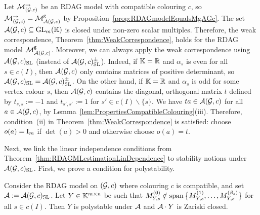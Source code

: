 \begin{remark}
	\label{rem:RDAGweakCorrespondence} %
	Let $\mathcal{M}_{(\mathcal{G}, c)}^{\to}$ be an RDAG model with compatible colouring $c$, so $\mathcal{M}_{(\mathcal{G}, c)}^{\to} = \mathcal{M}^{\mathtt{g}}_{\mathcal{A}(\mathcal{G}, c)}$ by Proposition~\ref{prop:RDAGmodelEqualsMgAGc}. The set $\mathcal{A}(\mathcal{G}, c) \subseteq \operatorname{GL}_m(\mathbb K)$ is closed under non-zero scalar multiples. Therefore, the weak correspondence, Theorem~\ref{thm:WeakCorrespondence}, holds for the RDAG model $\mathcal{M}^{\mathtt{g}}_{\mathcal{A}(\mathcal{G}, c)}$. Moreover, we can always apply the weak correspondence using $\mathcal{A}(\mathcal{G}, c)_{\operatorname{SL}}$ (instead of $\mathcal{A}(\mathcal{G}, c)_{\operatorname{SL}}^{\pm}$). Indeed, if $\mathbb K = \mathbb R$ and $\alpha_s$ is even for all $s \in c(I)$, then $\mathcal{A}(\mathcal{G}, c)$ only contains matrices of positive determinant, so $\mathcal{A}(\mathcal{G}, c)_{\operatorname{SL}} = \mathcal{A}(\mathcal{G}, c)_{\operatorname{SL}}^{\pm}$. On the other hand, if $\mathbb K = \mathbb R$ and $\alpha_s$ is odd for some vertex colour $s$, then $\mathcal{A}(\mathcal{G}, c)$ contains the diagonal, orthogonal matrix $t$ defined by $t_{s,s} := -1$ and $t_{s',s'} := 1$ for $s' \in c(I) \backslash \{s\}$. We have $ta \in \mathcal{A}(\mathcal{G}, c)$ for all $a \in \mathcal{A}(\mathcal{G}, c)$, by Lemma~\ref{lem:PropertiesCompatibleColouring}(iii). Therefore, condition~(ii) in Theorem~\ref{thm:WeakCorrespondence} is satisfied: choose $o(a) = \operatorname{I}_m$ if $\det(a) > 0$ and otherwise choose $o(a) = t$.
	\hfill\remSymbol
\end{remark}

Next, we link the linear independence conditions from Theorem~\ref{thm:RDAGMLestimationLinDependence} to stability notions under $\mathcal{A}(\mathcal{G}, c)_{\operatorname{SL}}$. First, we prove a condition for polystability.

\begin{lemma} \label{lem:RDAGSemistablePolystable}
	Consider the RDAG model on $(\mathcal{G}, c)$ where colouring $c$ is compatible,
	and set $\mathcal{A} := \mathcal{A}(\mathcal{G}, c)_{\operatorname{SL}}$. 
	Let $Y \in \mathbb K^{m \times n}$ be such that $M_{Y,s}^{(0)} \notin \operatorname{span} \big\lbrace M_{Y,s}^{(1)},\ldots, M_{Y,s}^{(\beta_s)} \big\rbrace$ for all $s \in c(I)$. Then $Y$ is polystable under $\mathcal{A}$ and $\mathcal{A} \cdot Y$ is Zariski closed.
\end{lemma}

